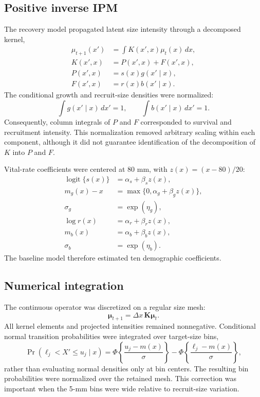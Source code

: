 \documentclass[11pt]{article}
\newcommand{\Prb}{\mathop{\mathrm{Pr}}}
\begin{document}
\subsection{Positive inverse IPM}

The recovery model propagated latent size intensity through a decomposed
kernel,
\begin{align}
  \mu_{t+1}(x') &= \int K(x',x)\mu_t(x)\,dx,\\
  K(x',x) &= P(x',x)+F(x',x),\\
  P(x',x) &= s(x)g(x'\mid x),\\
  F(x',x) &= r(x)b(x'\mid x).
\end{align}
The conditional growth and recruit-size densities were normalized:
\begin{equation}
  \int g(x'\mid x)\,dx'=1,\qquad
  \int b(x'\mid x)\,dx'=1.
\end{equation}
Consequently, column integrals of \(P\) and \(F\) corresponded to survival and
recruitment intensity. This normalization removed arbitrary scaling within
each component, although it did not guarantee identification of the
decomposition of \(K\) into \(P\) and \(F\).

Vital-rate coefficients were centered at 80 mm, with
\(z(x)=(x-80)/20\):
\begin{align}
  \operatorname{logit}\{s(x)\}
    &= \alpha_s+\beta_sz(x),\\
  m_g(x)-x
    &= \max\{0,\alpha_g+\beta_gz(x)\},\\
  \sigma_g &= \exp(\eta_g),\\
  \log r(x)
    &= \alpha_r+\beta_rz(x),\\
  m_b(x)
    &= \alpha_b+\beta_bz(x),\\
  \sigma_b &= \exp(\eta_b).
\end{align}
The baseline model therefore estimated ten demographic coefficients.

\subsection{Numerical integration}

The continuous operator was discretized on a regular size mesh:
\begin{equation}
  \boldsymbol{\mu}_{t+1}
  = \Delta x\,\mathbf{K}\boldsymbol{\mu}_t.
\end{equation}
All kernel elements and projected intensities remained nonnegative.
Conditional normal transition probabilities were integrated over target-size
bins,
\begin{equation}
  \Prb(\ell_j<X'\leq u_j\mid x)
  =
  \Phi\left\{\frac{u_j-m(x)}{\sigma}\right\}
  -
  \Phi\left\{\frac{\ell_j-m(x)}{\sigma}\right\},
\end{equation}
rather than evaluating normal densities only at bin centers. The resulting
bin probabilities were normalized over the retained mesh. This correction was
important when the 5-mm bins were wide relative to recruit-size variation.
\end{document}
